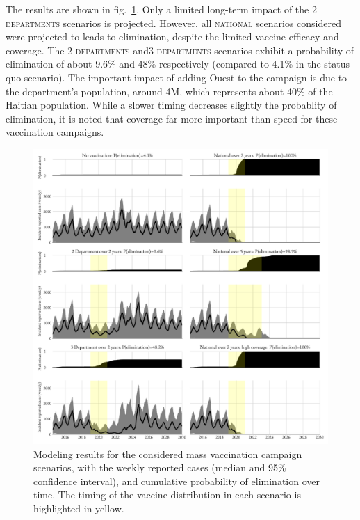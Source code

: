 The results are shown in fig.~\ref{fig:OCVresults}. Only a limited long-term impact of the \textsc{2 departments} scenarios is projected. However, all \textsc{national} scenarios considered were projected to leads to elimination, despite the limited vaccine efficacy and coverage. The \textsc{2 departments} and\textsc{3 departments} scenarios exhibit a probability of elimination of about 9.6\% and 48\% respectively (compared to 4.1\% in the status quo scenario). The important impact of adding Ouest to the campaign is due to the department's population, around 4M, which represents about 40\% of the Haitian population. While a slower timing decreases slightly the probablity of elimination, it is noted that coverage far more important than speed for these vaccination campaigns.

\begin{figure}[h!]%
\begin{center}
\includegraphics{fig_cholera-haiti-ocv/haiti-scn.pdf}
\caption[Cholera in Haiti after mass vaccination campaigns]{Modeling results for the considered mass vaccination campaign scenarios, with the weekly reported cases (median and 95\% confidence interval), and cumulative probability of elimination over time. The timing of the vaccine distribution in each scenario is highlighted in yellow.}
\label{fig:OCVresults}
\end{center}
\end{figure}
 
